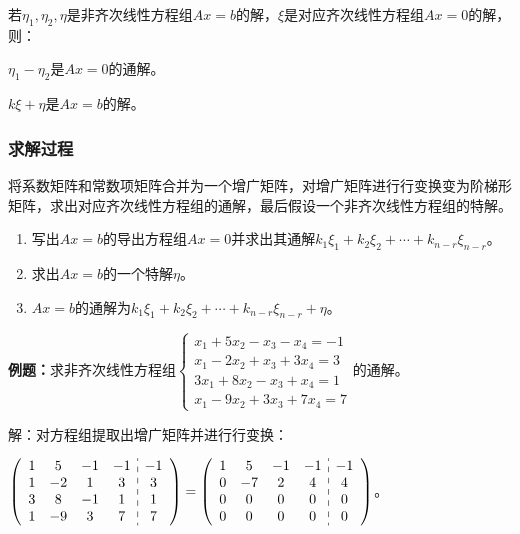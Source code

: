 \documentclass[UTF8, 12pt]{ctexart}
\begin{document}
若$\eta_1,\eta_2,\eta$是非齐次线性方程组$Ax=b$的解，$\xi$是对应齐次线性方程组$Ax=0$的解，则：

$\eta_1-\eta_2$是$Ax=0$的通解。

$k\xi+\eta$是$Ax=b$的解。

\subsubsection{求解过程}

将系数矩阵和常数项矩阵合并为一个增广矩阵，对增广矩阵进行行变换变为阶梯形矩阵，求出对应齐次线性方程组的通解，最后假设一个非齐次线性方程组的特解。

\begin{enumerate}
    \item 写出$Ax=b$的导出方程组$Ax=0$并求出其通解$k_1\xi_1+k_2\xi_2+\cdots+k_{n-r}\xi_{n-r}$。
    \item 求出$Ax=b$的一个特解$\eta$。
    \item $Ax=b$的通解为$k_1\xi_1+k_2\xi_2+\cdots+k_{n-r}\xi_{n-r}+\eta$。
\end{enumerate}

\textbf{例题：}求非齐次线性方程组$\left\{\begin{array}{l}
    x_1+5x_2-x_3-x_4=-1 \\
    x_1-2x_2+x_3+3x_4=3 \\
    3x_1+8x_2-x_3+x_4=1 \\
    x_1-9x_2+3x_3+7x_4=7
\end{array}\right.$的通解。

解：对方程组提取出增广矩阵并进行行变换：\medskip

$\left(\begin{array}{c:c}
    \begin{matrix}
        1 & 5 & -1 & -1 \\
        1 & -2 & 1 & 3 \\
        3 & 8 & -1 & 1 \\
        1 & -9 & 3 & 7
    \end{matrix}&
    \begin{matrix}
        -1 \\
        3 \\
        1 \\
        7
    \end{matrix}
\end{array}\right)=\left(\begin{array}{c:c}
    \begin{matrix}
        1 & 5 & -1 & -1 \\
        0 & -7 & 2 & 4 \\
        0 & 0 & 0 & 0 \\
        0 & 0 & 0 & 0
    \end{matrix}&
    \begin{matrix}
        -1 \\
        4 \\
        0 \\
        0
    \end{matrix}
\end{array}\right)$。\medskip
\end{document}
